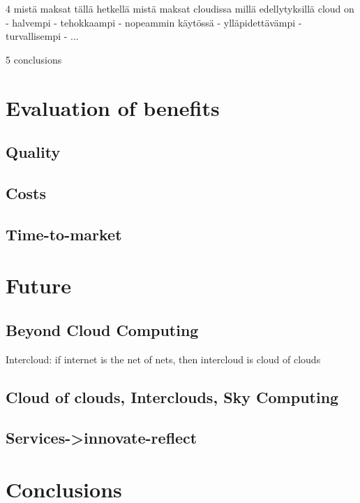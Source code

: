 \documentclass{tktltiki}
\begin{document}
4 mistä maksat tällä hetkellä
    mistä maksat cloudissa
    millä edellytyksillä cloud on
   - halvempi
   - tehokkaampi
   - nopeammin käytössä
   - ylläpidettävämpi
   - turvallisempi
   - ...

5 conclusions


\section{Evaluation of benefits}

\subsection{Quality}

\subsection{Costs}

\subsection{Time-to-market}







\section{Future}

\subsection{Beyond Cloud Computing}

Intercloud: if internet is the net of nets, then intercloud is cloud of clouds

\subsection{Cloud of clouds, Interclouds, Sky Computing}

\subsection{Services->innovate-reflect}


\section{Conclusions}
\end{document}
